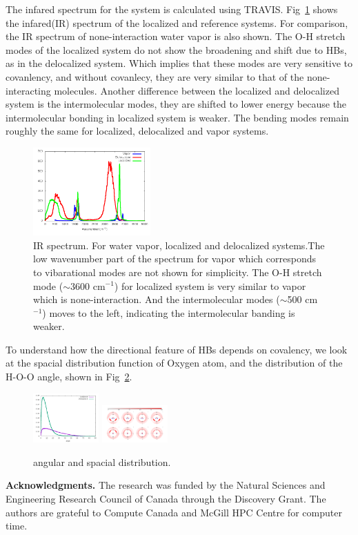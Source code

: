 \documentclass[prl,twocolumn,showpacs]{revtex4}
\begin{document}
The infared spectrum for the system is calculated using TRAVIS. Fig~\ref{Fig:IR} shows the infared(IR) spectrum of the localized and reference systems. For comparison, the IR spectrum of none-interaction water vapor is also shown. The O-H stretch modes of the localized system do not show the broadening and shift due to HBs, as in the delocalized system. Which implies that these modes are very sensitive to covanlency, and without covanlecy, they are very similar to that of the none-interacting molecules. Another difference between the localized and delocalized system is the intermolecular modes, they are shifted to lower energy because the intermolecular bonding in localized system is weaker. The bending modes remain roughly the same for localized, delocalized and vapor systems.

\begin{figure}
\includegraphics[width=0.4\textwidth]{all_ir}
\caption{IR spectrum. For water vapor, localized and delocalized systems.\new  The low wavenumber part of the spectrum for vapor which corresponds to vibarational modes are not shown for simplicity. \old The O-H stretch mode ($\sim$3600 cm$^{-1}$) for localized system is very similar to vapor which is none-interaction. And the intermolecular modes ($\sim$500 cm$^{-1}$) moves to the left, indicating the intermolecular banding is weaker. } \label{Fig:IR}
\end{figure}

To understand how the directional feature of HBs depends on covalency, we look at the spacial distribution function of Oxygen atom, and the distribution of the H-O-O angle, shown in Fig~\ref{Fig:SDF}. 

\begin{figure}
\includegraphics[width=0.225\textwidth]{angular_dist}
\includegraphics[width=0.225\textwidth]{SDF}
\caption{angular and spacial distribution. } \label{Fig:SDF}
\end{figure}

\textbf{Acknowledgments.} The research was funded by the Natural Sciences and Engineering Research Council of Canada through the Discovery Grant. The authors are grateful to Compute Canada and McGill HPC Centre for computer time.

\end{document}
